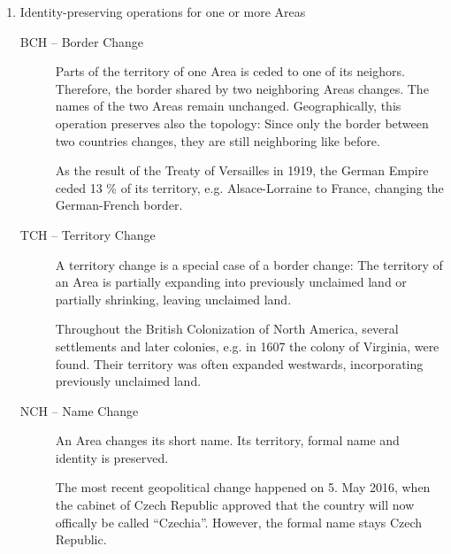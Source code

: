 \begin{enumerate}
  \item Identity-preserving operations for one or more Areas
  \begin{description}
    \item[BCH -- Border Change]
    Parts of the territory of one Area is ceded to one of its neighors. Therefore, the border shared by two neighboring Areas changes. The names of the two Areas remain unchanged. Geographically, this operation preserves also the topology: Since only the border between two countries changes, they are still neighboring like before. \\
    \begin{footnotesize}
      As the result of the Treaty of Versailles in 1919, the German Empire ceded 13 \% of its territory, e.g. Alsace-Lorraine to France, changing the German-French border.
    \end{footnotesize}
    \item[TCH -- Territory Change]
    A territory change is a special case of a border change: The territory of an Area is partially expanding into previously unclaimed land or partially shrinking, leaving unclaimed land. \\
    \begin{footnotesize}
      Throughout the British Colonization of North America, several settlements and later colonies, e.g. in 1607 the colony of Virginia, were found. Their territory was often expanded westwards, incorporating previously unclaimed land.
    \end{footnotesize}
    \item[NCH -- Name Change]
    An Area changes its short name. Its territory, formal name and identity is preserved. \\
    \begin{footnotesize}
      The most recent geopolitical change happened on 5. May 2016, when the cabinet of Czech Republic approved that the country will now offically be called ``Czechia''. However, the formal name stays Czech Republic.
    \end{footnotesize}
  \end{description}
\end{enumerate}

